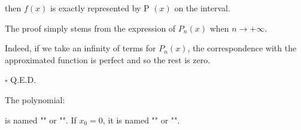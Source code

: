 	then $f (x)$ is exactly represented by P $(x)$ on the interval.
	\begin{dem}
	The proof simply stems from the expression of $P_n(x)$ when $n\rightarrow +\infty$.
	
	Indeed, if we take an infinity of terms for $P_n(x)$, the correspondence with the approximated function is perfect and so the rest is zero.
	\begin{flushright}
		$\square$  Q.E.D.
	\end{flushright}
	\end{dem}
	The polynomial:
	
	is named "" or "". If $x_0=0$, it is named "" or "".
	
